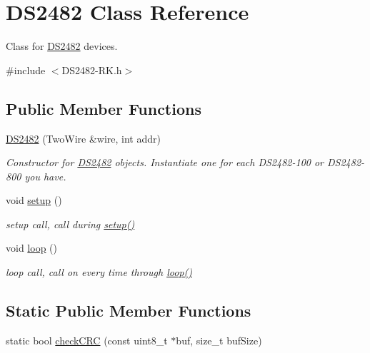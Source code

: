 \hypertarget{class_d_s2482}{}\section{D\+S2482 Class Reference}
\label{class_d_s2482}


Class for \mbox{\hyperlink{class_d_s2482}{D\+S2482}} devices.  




{\ttfamily \#include $<$D\+S2482-\/\+R\+K.\+h$>$}

\subsection*{Public Member Functions}
\begin{DoxyCompactItemize}
\item 
\mbox{\hyperlink{class_d_s2482_ab048669551660da42318e10fa8457444}{D\+S2482}} (Two\+Wire \&wire, int addr)
\begin{DoxyCompactList}\small\item\em Constructor for \mbox{\hyperlink{class_d_s2482}{D\+S2482}} objects. Instantiate one for each D\+S2482-\/100 or D\+S2482-\/800 you have. \end{DoxyCompactList}\item 
\mbox{\label{class_d_s2482_ad99cc97303e8709fd5277f49289f6e6f}} 
void \mbox{\hyperlink{class_d_s2482_ad99cc97303e8709fd5277f49289f6e6f}{setup}} ()
\begin{DoxyCompactList}\small\item\em setup call, call during \mbox{\hyperlink{class_d_s2482_ad99cc97303e8709fd5277f49289f6e6f}{setup()}} \end{DoxyCompactList}\item 
\mbox{\label{class_d_s2482_a28f5f71ae64c58e71dd8cba3c14a2960}} 
void \mbox{\hyperlink{class_d_s2482_a28f5f71ae64c58e71dd8cba3c14a2960}{loop}} ()
\begin{DoxyCompactList}\small\item\em loop call, call on every time through \mbox{\hyperlink{class_d_s2482_a28f5f71ae64c58e71dd8cba3c14a2960}{loop()}} \end{DoxyCompactList}\end{DoxyCompactItemize}
\subsection*{Static Public Member Functions}
\begin{DoxyCompactItemize}
\item 
static bool \mbox{\hyperlink{class_d_s2482_af67372aa2f9fa896f46ca4766104cea0}{check\+C\+RC}} (const uint8\+\_\+t $\ast$buf, size\+\_\+t buf\+Size)
\end{DoxyCompactItemize}
